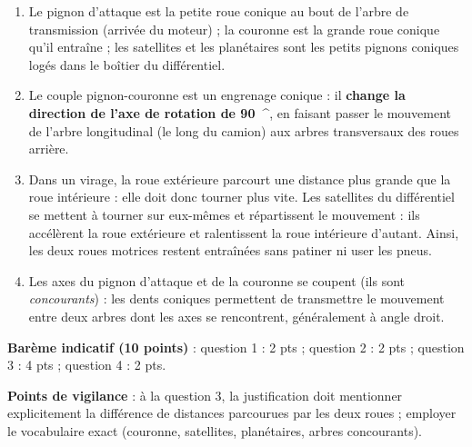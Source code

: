 \documentclass[11pt]{article}
\providecommand{\degree}{^{\circ}}
\begin{document}
\begin{corrige}
\begin{enumerate}
\item Le pignon d'attaque est la petite roue conique au bout de l'arbre de transmission (arrivée du moteur) ; la couronne est la grande roue conique qu'il entraîne ; les satellites et les planétaires sont les petits pignons coniques logés dans le boîtier du différentiel.
\item Le couple pignon-couronne est un engrenage conique : il \textbf{change la direction de l'axe de rotation de \SI{90}{\degree}}, en faisant passer le mouvement de l'arbre longitudinal (le long du camion) aux arbres transversaux des roues arrière.
\item Dans un virage, la roue extérieure parcourt une distance plus grande que la roue intérieure : elle doit donc tourner plus vite. Les satellites du différentiel se mettent à tourner sur eux-mêmes et répartissent le mouvement : ils accélèrent la roue extérieure et ralentissent la roue intérieure d'autant. Ainsi, les deux roues motrices restent entraînées sans patiner ni user les pneus.
\item Les axes du pignon d'attaque et de la couronne se coupent (ils sont \emph{concourants}) : les dents coniques permettent de transmettre le mouvement entre deux arbres dont les axes se rencontrent, généralement à angle droit.
\end{enumerate}
\textbf{Barème indicatif (10 points)} : question 1 : 2 pts ; question 2 : 2 pts ; question 3 : 4 pts ; question 4 : 2 pts.\par
\textbf{Points de vigilance} : à la question 3, la justification doit mentionner explicitement la différence de distances parcourues par les deux roues ; employer le vocabulaire exact (couronne, satellites, planétaires, arbres concourants).
\end{corrige}
\end{document}
